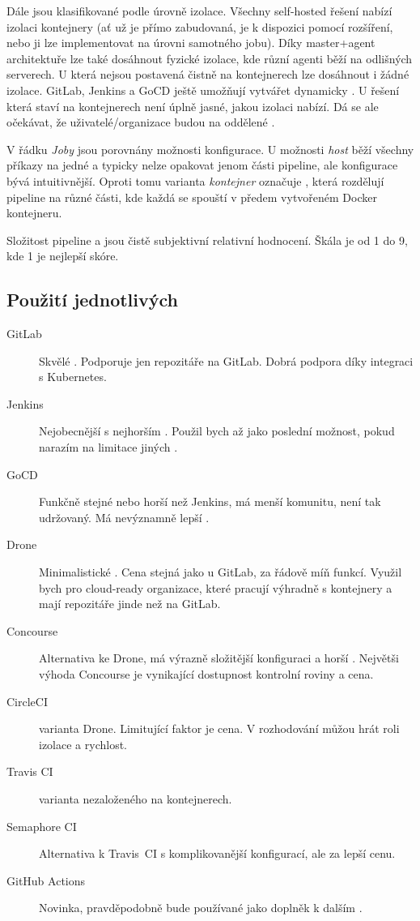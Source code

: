    Dále jsou \CI klasifikované podle úrovně izolace. Všechny self-hosted řešení nabízí izolaci kontejnery (ať už je přímo zabudovaná, je k dispozici pomocí rozšíření, nebo ji lze implementovat na úrovni samotného jobu). Díky master+agent architektuře lze také dosáhnout fyzické izolace, kde různí agenti běží na odlišných serverech. U \CI která nejsou postavená čistně na kontejnerech lze dosáhnout i žádné izolace. GitLab, Jenkins a GoCD ještě umožňují vytvářet dynamicky . U  řešení která staví na kontejnerech není úplně jasné, jakou izolaci nabízí. Dá se ale očekávat, že uživatelé/organizace budou na oddělené .

    V řádku \textit{Joby} jsou porovnány možnosti konfigurace. U možnosti \textit{host} běží všechny příkazy na jedné  a typicky nelze opakovat jenom části pipeline, ale konfigurace bývá intuitivnější. Oproti tomu varianta \textit{kontejner} označuje \CI, která rozdělují pipeline na různé části, kde každá se spouští v předem vytvořeném Docker kontejneru.

    Složitost pipeline a  jsou čistě subjektivní relativní hodnocení. Škála je od 1 do 9, kde 1 je nejlepší skóre.

    \subsection{Použití jednotlivých \CI}
        \begin{description}
            \item[GitLab] Skvělé \CI. Podporuje jen repozitáře na GitLab. Dobrá podpora \CD díky integraci s Kubernetes.
            \item[Jenkins] Nejobecnější \CI s nejhorším . Použil bych až jako poslední možnost, pokud narazím na limitace jiných \CI.
            \item[GoCD] Funkčně stejné nebo horší než Jenkins, má menší komunitu, není tak udržovaný. Má nevýznamně lepší .
            \item[Drone] Minimalistické \CI. Cena stejná jako u GitLab, za řádově míň funkcí. Využil bych pro cloud-ready organizace, které pracují výhradně s kontejnery a mají repozitáře jinde než na GitLab.
            \item[Concourse] Alternativa ke Drone, má výrazně složitější konfiguraci a horší . Největši výhoda Concourse je vynikající dostupnost kontrolní roviny a cena.
            \item[CircleCI]  varianta Drone. Limitující faktor je cena. V rozhodování můžou hrát roli izolace a rychlost.
            \item[Travis CI]  varianta \CI nezaloženého na kontejnerech.
            \item[Semaphore CI] Alternativa k Travis~CI s komplikovanější konfigurací, ale za lepší cenu.
            \item[GitHub Actions] Novinka, pravděpodobně bude používané jako doplněk k dalším \CI.
        \end{description}
